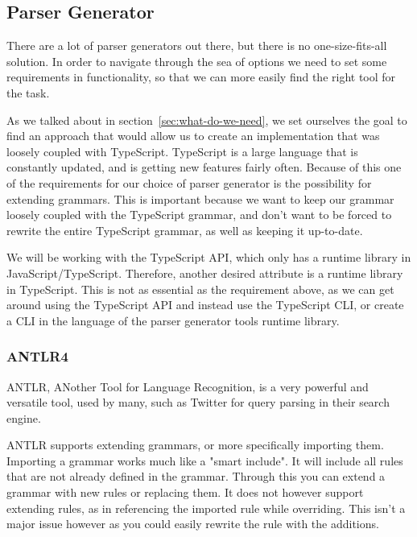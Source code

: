 

\subsection{Parser Generator}\label{subsec:parser-generator}

There are a lot of parser generators out there, but there is no one-size-fits-all solution.
In order to navigate through the sea of options we need to set some requirements in functionality, so that we can more easily find the right tool for the task.

As we talked about in section~\vref{sec:what-do-we-need}, we set ourselves the goal to find an approach that would allow us to create an implementation that was loosely coupled with TypeScript.
TypeScript is a large language that is constantly updated, and is getting new features fairly often.
Because of this one of the requirements for our choice of parser generator is the possibility for extending grammars.
This is important because we want to keep our grammar loosely coupled with the TypeScript grammar, and don't want to be forced to rewrite the entire TypeScript grammar, as well as keeping it up-to-date.

We will be working with the TypeScript API, which only has a runtime library in JavaScript/TypeScript.
Therefore, another desired attribute is a runtime library in TypeScript.
This is not as essential as the requirement above, as we can get around using the TypeScript API and instead use the TypeScript CLI, or create a CLI in the language of the parser generator tools runtime library.


\subsubsection{ANTLR4}\label{subsubsec:antlr}

ANTLR, ANother Tool for Language Recognition, is a very powerful and versatile tool, used by many, such as Twitter for query parsing in their search engine\cite{Terence2012}.

ANTLR supports extending grammars, or more specifically importing them.
Importing a grammar works much like a "smart include".
It will include all rules that are not already defined in the grammar.
Through this you can extend a grammar with new rules or replacing them.
It does not however support extending rules, as in referencing the imported rule while overriding\cite{Terence2012}.
This isn't a major issue however as you could easily rewrite the rule with the additions.

